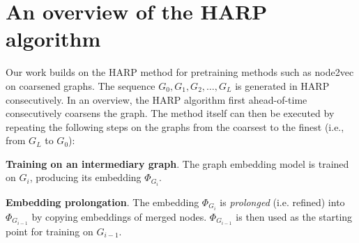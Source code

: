 \section{An overview of the HARP algorithm}\label{sec:harp}

Our work builds on the HARP method \cite{chen_harp_2018} for pretraining methods such as node2vec \cite{grover_node2vec_2016} on coarsened graphs. The sequence \( G_0, G_1, G_2, \dots, G_L \) is generated in HARP consecutively. In an overview, the HARP algorithm first ahead-of-time consecutively coarsens the graph. The method itself can then be executed by repeating the following steps on the graphs from the coarsest to the finest (i.e., from \( G_L \) to \( G_0 \)):
\begin{enumerate*}
  \item \textbf{Training on an intermediary graph}. The graph embedding model is trained on \( G_i \), producing its embedding \( \Phi_{G_i} \).
  \item \textbf{Embedding prolongation}. The embedding \( \Phi_{G_i} \) is \textit{prolonged} (i.e. refined) into \( \Phi_{G_{i - 1}} \) by copying embeddings of merged nodes. \( \Phi_{G_{i - 1}} \) is then used as the starting point for training on \( G_{i - 1} \).
\end{enumerate*}
